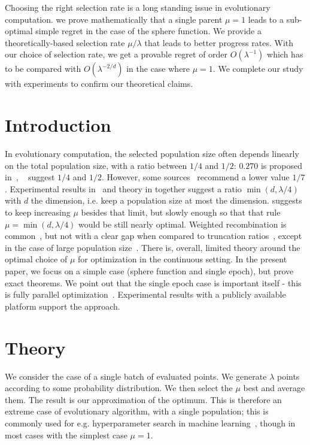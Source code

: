 Choosing the right selection rate is a long standing issue in evolutionary computation. we prove mathematically that a single parent $\mu=1$ leads to a sub-optimal simple regret in the case of the sphere function. We provide a theoretically-based selection rate $\mu/\lambda$ that leads  to better progress rates. With our choice of selection rate, we get a provable regret of order $O(\lambda^{-1})$ which has to be compared with $O(\lambda^{-2/d})$ in the case where $\mu=1$. We complete our study with experiments to confirm our theoretical claims. %
\section{Introduction}
In evolutionary computation, the selected population size often depends linearly on the total population size, with a ratio between $1/4$ and $1/2$: $0.270$ is proposed in~\cite{escompr}, ~\cite{HAN,cmsa} suggest $1/4$ and $1/2$.
However,
some sources~\cite{amorales} recommend a lower value $1/7$. Experimental results in~\cite{ratio} and theory in \cite{fournierAlgorithmica} together suggest a ratio $\min(d,\lambda/4)$ with $d$ the dimension, i.e. keep a population size at most the dimension. \cite{jeb} suggests to keep increasing $\mu$ besides that limit, but slowly enough so that that rule $\mu=\min(d,\lambda/4)$ would be still nearly optimal. Weighted recombination is common~\cite{weightdirk}, but not with a clear gap when compared to truncation ratios~\cite{esniko}, except in the case of large population size~\cite{sumotori}.
There is, overall, limited theory around the optimal choice of $\mu$ for optimization in the continuous setting. 
In the present paper, we focus on a simple case (sphere function and single epoch), but prove exact theorems. 
We point out that the single epoch case is important  itself - this is fully parallel optimization~\cite{nie,mckay,bergstra2012random,bousquet}.
Experimental results with a publicly available platform support the approach.
\section{Theory}
We consider the case of a single batch of evaluated points. We generate $\lambda$ points according to some probability distribution. We then select the $\mu$ best and average them. The result is our approximation of the optimum. This is therefore an extreme case of evolutionary algorithm, with a single population; this is commonly used for e.g. hyperparameter search in machine learning~\cite{bergstra,bousquet}, though in most cases with the simplest case $\mu=1$.
